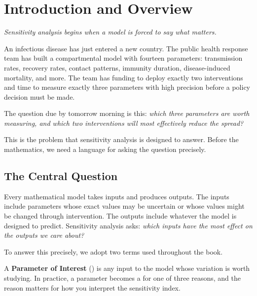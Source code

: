 \chapter{Introduction and Overview}

\begin{flushright}
\textit{Sensitivity analysis begins when a model is forced to say what matters.}
\end{flushright}

\bigskip

An infectious disease has just entered a new country.
The public health response team has built a compartmental model with fourteen
parameters: transmission rates, recovery rates, contact patterns,
immunity duration, disease-induced mortality, and more.
The team has funding to deploy exactly two interventions
and time to measure exactly three parameters with high precision
before a policy decision must be made.

The question due by tomorrow morning is this: \emph{which three parameters
are worth measuring, and which two interventions will most effectively
reduce the spread?}

This is the problem that sensitivity analysis is designed to answer.
Before the mathematics, we need a language for asking the question precisely.

\section{The Central Question}
\label{sec:centralquestion}

Every mathematical model takes inputs and produces outputs.
The inputs include parameters whose exact values may be uncertain
or whose values might be changed through intervention.
The outputs include whatever the model is designed to predict.
Sensitivity analysis asks: \emph{which inputs have the most
effect on the outputs we care about?}

To answer this precisely, we adopt two terms used throughout the book.

\medskip

A \textbf{Parameter of Interest} (\POI) is any input to the model
whose variation is worth studying. In practice, a parameter becomes a \POI
for one of three reasons, and the reason matters for how you interpret
the sensitivity index.

